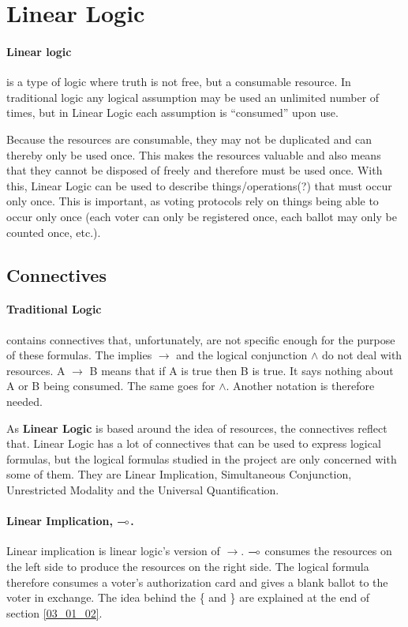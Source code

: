 \section{Linear Logic}
\label{03_01}

\paragraph{Linear logic} is a type of logic where truth is not free, but a consumable resource. In traditional logic any logical assumption may be used an unlimited number of times, but in Linear Logic each assumption is “consumed” upon use.

Because the resources are consumable, they may not be duplicated and can thereby only be used once. This makes the resources valuable and also means that they cannot be disposed of freely and therefore must be used once. With this, Linear Logic can be used to describe things/operations(?) that must occur only once. This is important, as voting protocols rely on things being able to occur only once (each voter can only be registered once, each ballot may only be counted once, etc.).

\subsection{Connectives}
\label{03_01_01}

\paragraph{Traditional Logic} contains connectives that, unfortunately, are not specific enough for the purpose of these formulas. The implies $\rightarrow$ and the logical conjunction $\wedge$ do not deal with resources. A $\rightarrow$ B means that if A is true then B is true. It says nothing about A or B being consumed. The same goes for $\wedge$. Another notation is therefore needed. 

As \textbf{Linear Logic} is based around the idea of resources, the connectives reflect that. Linear Logic has a lot of connectives that can be used to express logical formulas, but the logical formulas studied in the project are only concerned with some of them. They are Linear Implication, Simultaneous Conjunction, Unrestricted Modality and the Universal Quantification.

\paragraph{Linear Implication, $\multimap$.} Linear implication is linear logic’s version of $\rightarrow$. $\multimap$ consumes the resources on the left side to produce the resources on the right side. The logical formula
therefore consumes a voter’s authorization card and gives a blank ballot to the voter in exchange. The idea behind the \{ and \} are explained at the end of section \ref{03_01_02}.

